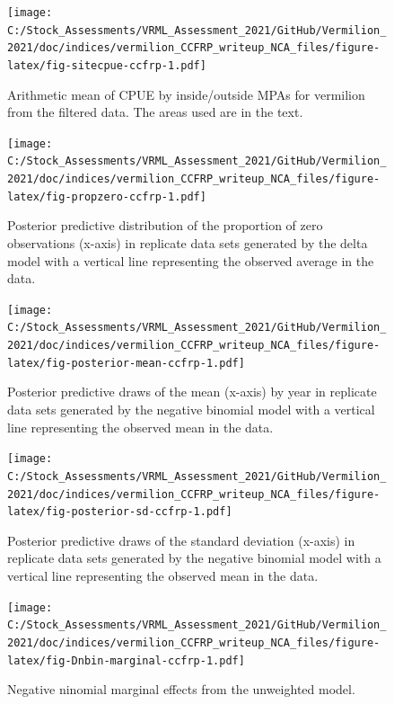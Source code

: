 \documentclass[11pt,
  english,
]{article}
\begin{document}
\begin{figure}
\centering
\texttt{[image: C:/Stock\_Assessments/VRML\_Assessment\_2021/GitHub/Vermilion\_2021/doc/indices/vermilion\_CCFRP\_writeup\_NCA\_files/figure-latex/fig-sitecpue-ccfrp-1.pdf]}
\caption{\label{fig:fig-sitecpue-ccfrp}Arithmetic mean of CPUE by inside/outside MPAs for vermilion from the filtered data. The areas used are in the text.}
\end{figure}

\begin{figure}
\centering
\texttt{[image: C:/Stock\_Assessments/VRML\_Assessment\_2021/GitHub/Vermilion\_2021/doc/indices/vermilion\_CCFRP\_writeup\_NCA\_files/figure-latex/fig-propzero-ccfrp-1.pdf]}
\caption{\label{fig:fig-propzero-ccfrp}Posterior predictive distribution of the proportion of zero observations (x-axis) in replicate data sets generated by the delta model with a vertical line representing the observed average in the data.}
\end{figure}

\begin{figure}
\centering
\texttt{[image: C:/Stock\_Assessments/VRML\_Assessment\_2021/GitHub/Vermilion\_2021/doc/indices/vermilion\_CCFRP\_writeup\_NCA\_files/figure-latex/fig-posterior-mean-ccfrp-1.pdf]}
\caption{\label{fig:fig-posterior-mean-ccfrp}Posterior predictive draws of the mean (x-axis) by year in replicate data sets generated by the negative binomial model with a vertical line representing the observed mean in the data.}
\end{figure}

\begin{figure}
\centering
\texttt{[image: C:/Stock\_Assessments/VRML\_Assessment\_2021/GitHub/Vermilion\_2021/doc/indices/vermilion\_CCFRP\_writeup\_NCA\_files/figure-latex/fig-posterior-sd-ccfrp-1.pdf]}
\caption{\label{fig:fig-posterior-sd-ccfrp}Posterior predictive draws of the standard deviation (x-axis) in replicate data sets generated by the negative binomial model with a vertical line representing the observed mean in the data.}
\end{figure}

\begin{figure}
\centering
\texttt{[image: C:/Stock\_Assessments/VRML\_Assessment\_2021/GitHub/Vermilion\_2021/doc/indices/vermilion\_CCFRP\_writeup\_NCA\_files/figure-latex/fig-Dnbin-marginal-ccfrp-1.pdf]}
\caption{\label{fig:fig-Dnbin-marginal-ccfrp}Negative ninomial marginal effects from the unweighted model.}
\end{figure}
\end{document}
